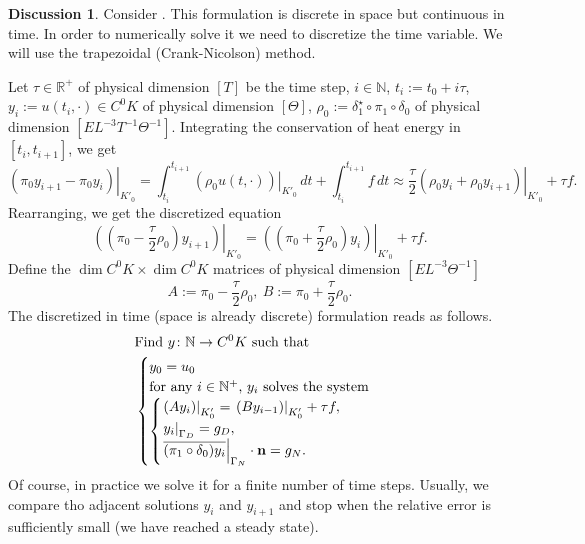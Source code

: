 \documentclass[fleqn]{article}
\theoremstyle{definition}
\newtheorem{discussion}[theorem]{Discussion}
\newcommand{\N}{\mathbb{N}}
\newcommand{\R}{\mathbb{R}}
\newcommand{\restrict}[2]{\left. #1 \right|_{#2}}
\begin{document}
\begin{discussion}
  Consider .
  This formulation is discrete in space but continuous in time.
  In order to numerically solve it we need to discretize the time variable.
  We will use the trapezoidal (Crank-Nicolson) method.

  Let
    $\tau \in \R^+$ of physical dimension $[T]$ be the time step,
    $i \in \N$,
    $t_i := t_0 + i \tau$,
    $y_i := u(t_i, \cdot) \in C^0 K$ of physical dimension $[\Theta]$,
    $\rho_0 := \delta_1^\star \circ \pi_1 \circ \delta_0$
      of physical dimension $[E L^{-3} T^{-1} \Theta^{-1}]$.
  Integrating the conservation of heat energy in $[t_i, t_{i + 1}]$, we get
  \begin{equation}
    \restrict{(\pi_0 y_{i + 1} - \pi_0 y_i)}{K'_0}
    =   \int_{t_i}^{t_{i + 1}} \restrict{(\rho_0 u(t, \cdot))}{K'_0}\, d t
      + \int_{t_i}^{t_{i + 1}} f\, d t
    \approx
    \frac{\tau}{2} \restrict{(\rho_0 y_i + \rho_0 y_{i + 1})}{K'_0} + \tau f.
  \end{equation}
  Rearranging, we get the discretized equation
  \begin{equation}
    \restrict{((\pi_0 - \frac{\tau}{2} \rho_0) y_{i + 1})}{K'_0}
    = \restrict{((\pi_0 + \frac{\tau}{2} \rho_0) y_i)}{K'_0} + \tau f.
  \end{equation}
  Define the $\dim C^0 K \times \dim C^0 K$ matrices of physical dimension
  $[E L^{-3} \Theta^{-1}]$
  \begin{equation}
    A := \pi_0 - \frac{\tau}{2} \rho_0,\ B := \pi_0 + \frac{\tau}{2} \rho_0.
  \end{equation}
  The discretized in time (space is already discrete) formulation reads as
  follows.
  \begin{equation}
    \begin{split}
      & \text{Find $y \colon \N \to C^0 K$ such that} \\
      &
      \begin{cases}
        y_0 = u_0 \\
        \text{for any $i \in \N^+$, $y_i$ solves the system} \\
        \begin{cases}
          \restrict{(A y_i)}{K'_0} = \restrict{(B y_{i - 1})}{K'_0} + \tau f, \\
          \restrict{y_i}{\Gamma_D} = g_D, \\
          \restrict{\overline{(\pi_1 \circ \delta_0) y_i}}{\Gamma_N}
            \cdot {\bf n} = g_N.
        \end{cases}
      \end{cases}
    \end{split}
  \end{equation}
  Of course, in practice we solve it for a finite number of time steps.
  Usually, we compare tho adjacent solutions $y_i$ and $y_{i + 1}$ and stop when
  the relative error is sufficiently small (we have reached a steady state).
\end{discussion}
\end{document}
